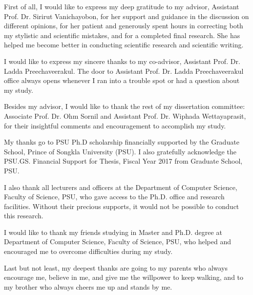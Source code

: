 \documentclass[../main/thesis.tex]{subfiles}
\begin{document}
\begin{acknowledgements}      

First of all, I would like to express my deep gratitude to my advisor, Assistant Prof. Dr. Sirirut Vanichayobon, for her support and guidance in the discussion on different opinions, for her patient and generously spent hours in correcting both my stylistic and scientific mistakes, and for a completed final research. She has helped me become better in conducting scientific research and scientific writing.

I would like to express my sincere thanks to my co-advisor, Assistant Prof. Dr. Ladda Preechaveerakul. The door to Assistant Prof. Dr. Ladda Preechaveerakul office always opens whenever I ran into a trouble spot or had a question about my study.

Besides my advisor, I would like to thank the rest of my dissertation committee: Associate Prof. Dr. Ohm Sornil and Assistant Prof. Dr. Wiphada Wettayaprasit, for their insightful comments and encouragement to accomplish my study.

My thanks go to PSU Ph.D scholarship financially supported by the Graduate School, Prince of Songkla University (PSU). I also gratefully acknowledge the PSU.GS. Financial Support for Thesis, Fiscal Year 2017 from Graduate School, PSU.

I also thank all lecturers and officers at the Department of Computer Science, Faculty of Science, PSU, who gave access to the Ph.D. office and research facilities. Without their precious supports, it would not be possible to conduct this research.

I would like to thank my friends studying in Master and Ph.D. degree at Department of Computer Science, Faculty of Science, PSU, who helped and encouraged me to overcome difficulties during my study.

Last but not least, my deepest thanks are going to my parents who always encourage me, believe in me, and give me the willpower to keep walking, and to my brother who always cheers me up and stands by me.

%


\end{acknowledgements}
\end{document}
